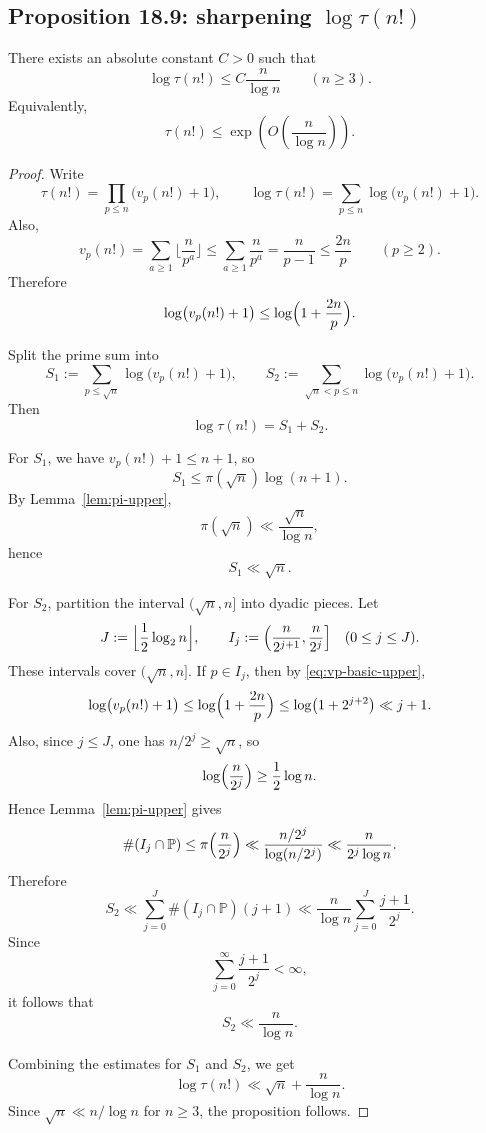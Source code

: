 \subsection{Proposition 18.9: sharpening \(\log\tau(n!)\)}

\begin{proposition}[Proposition~18.9]\label{prop:tau-factorial-sharp}
There exists an absolute constant \(C>0\) such that
\[
\log\tau(n!) \le C\frac{n}{\log n}
\qquad (n\ge 3).
\]
Equivalently,
\[
\tau(n!) \le \exp\!\left(O\!\left(\frac{n}{\log n}\right)\right).
\]
\end{proposition}

\begin{proof}
Write
\[
\tau(n!)=\prod_{p\le n}\bigl(v_p(n!)+1\bigr),
\qquad
\log\tau(n!)=\sum_{p\le n}\log\bigl(v_p(n!)+1\bigr).
\]
Also,
\[
v_p(n!)=\sum_{a\ge 1}\Big\lfloor\frac{n}{p^a}\Big\rfloor
\le \sum_{a\ge 1}\frac{n}{p^a}
=\frac{n}{p-1}
\le \frac{2n}{p}
\qquad (p\ge 2).
\]
Therefore
\begin{equation}\label{eq:vp-basic-upper}
\log\bigl(v_p(n!)+1\bigr)\le \log\Bigl(1+\frac{2n}{p}\Bigr).
\end{equation}

Split the prime sum into
\[
S_1:=\sum_{p\le \sqrt n}\log\bigl(v_p(n!)+1\bigr),
\qquad
S_2:=\sum_{\sqrt n<p\le n}\log\bigl(v_p(n!)+1\bigr).
\]
Then
\[
\log\tau(n!)=S_1+S_2.
\]

For \(S_1\), we have \(v_p(n!)+1\le n+1\), so
\[
S_1\le \pi(\sqrt n)\log(n+1).
\]
By Lemma~\ref{lem:pi-upper},
\[
\pi(\sqrt n)\ll \frac{\sqrt n}{\log n},
\]
hence
\[
S_1\ll \sqrt n.
\]

For \(S_2\), partition the interval \((\sqrt n,n]\) into dyadic pieces. Let
\[
J:=\Big\lfloor \frac12\log_2 n\Big\rfloor,
\qquad
I_j:=\Bigl(\frac{n}{2^{j+1}},\frac{n}{2^j}\Bigr]
\quad (0\le j\le J).
\]
These intervals cover \((\sqrt n,n]\). If \(p\in I_j\), then by \eqref{eq:vp-basic-upper},
\[
\log\bigl(v_p(n!)+1\bigr)
\le \log\Bigl(1+\frac{2n}{p}\Bigr)
\le \log\bigl(1+2^{j+2}\bigr)
\ll j+1.
\]
Also, since \(j\le J\), one has \(n/2^j\ge \sqrt n\), so
\[
\log\Bigl(\frac{n}{2^j}\Bigr)\ge \frac12\log n.
\]
Hence Lemma~\ref{lem:pi-upper} gives
\[
\#(I_j\cap \mathbb P)
\le \pi\Bigl(\frac{n}{2^j}\Bigr)
\ll \frac{n/2^j}{\log(n/2^j)}
\ll \frac{n}{2^j\log n}.
\]
Therefore
\[
S_2
\ll \sum_{j=0}^{J}\#(I_j\cap \mathbb P)(j+1)
\ll \frac{n}{\log n}\sum_{j=0}^{J}\frac{j+1}{2^j}.
\]
Since
\[
\sum_{j=0}^{\infty}\frac{j+1}{2^j}<\infty,
\]
it follows that
\[
S_2\ll \frac{n}{\log n}.
\]

Combining the estimates for \(S_1\) and \(S_2\), we get
\[
\log\tau(n!)\ll \sqrt n+\frac{n}{\log n}.
\]
Since \(\sqrt n\ll n/\log n\) for \(n\ge 3\), the proposition follows.
\end{proof}

